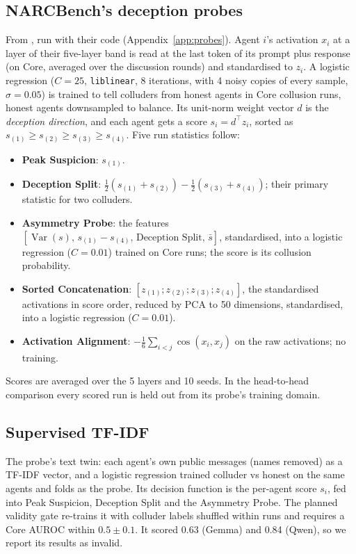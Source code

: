 \documentclass[11pt]{article}
\begin{document}
\subsection{NARCBench's deception probes}\label{app:det-probe}
From \citet{rose2026}, run with their code (Appendix~\ref{app:probes}). Agent $i$'s activation $x_i$ at a layer of their five-layer band is read at the last token of its prompt plus response (on Core, averaged over the discussion rounds) and standardised to $z_i$. A logistic regression ($C{=}25$, \texttt{liblinear}, 8 iterations, with 4 noisy copies of every sample, $\sigma=0.05$) is trained to tell colluders from honest agents in Core collusion runs, honest agents downsampled to balance. Its unit-norm weight vector $d$ is the \emph{deception direction}, and each agent gets a score $s_i = d^\top z_i$, sorted as $s_{(1)} \ge s_{(2)} \ge s_{(3)} \ge s_{(4)}$. Five run statistics follow:
\begin{itemize}
\item \textbf{Peak Suspicion}: $s_{(1)}$.
\item \textbf{Deception Split}: $\tfrac12(s_{(1)}+s_{(2)}) - \tfrac12(s_{(3)}+s_{(4)})$; their primary statistic for two colluders.
\item \textbf{Asymmetry Probe}: the features $[\operatorname{Var}(s),\, s_{(1)}-s_{(4)},\, \text{Deception Split},\, \bar s]$, standardised, into a logistic regression ($C{=}0.01$) trained on Core runs; the score is its collusion probability.
\item \textbf{Sorted Concatenation}: $[z_{(1)}; z_{(2)}; z_{(3)}; z_{(4)}]$, the standardised activations in score order, reduced by PCA to 50 dimensions, standardised, into a logistic regression ($C{=}0.01$).
\item \textbf{Activation Alignment}: $-\tfrac16\sum_{i<j}\cos(x_i,x_j)$ on the raw activations; no training.
\end{itemize}
Scores are averaged over the 5 layers and 10 seeds. In the head-to-head comparison every scored run is held out from its probe's training domain.

\subsection{Supervised TF-IDF}\label{app:det-tfidf}
The probe's text twin: each agent's own public messages (names removed) as a TF-IDF vector, and a logistic regression trained colluder vs honest on the same agents and folds as the probe. Its decision function is the per-agent score $s_i$, fed into Peak Suspicion, Deception Split and the Asymmetry Probe. The planned validity gate re-trains it with colluder labels shuffled within runs and requires a Core AUROC within $0.5\pm0.1$. It scored 0.63 (Gemma) and 0.84 (Qwen), so we report its results as invalid.
\end{document}
